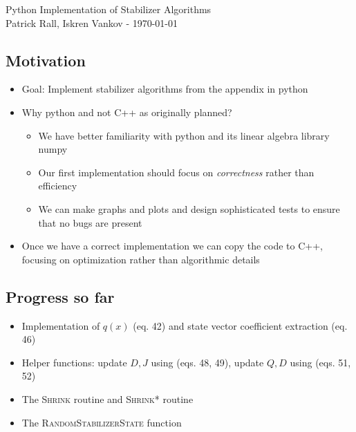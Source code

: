 \documentclass[11pt]{article}
\begin{document}
\begin{center}
    {\LARGE Python Implementation of Stabilizer Algorithms }
\vspace{2mm}
{\large \\ Patrick Rall, Iskren Vankov - \today}
\end{center}

\newenvironment{Figure}
  {\par\medskip\noindent\minipage{\linewidth}}
  {\endminipage\par\medskip}


\subsection*{Motivation}
\begin{itemize}
    \item Goal: Implement stabilizer algorithms from the appendix in python
    \item Why python and not C++ as originally planned? 
    \begin{itemize}
        \item We have better familiarity with python and its linear algebra library numpy 
        \item Our first implementation should focus on \textit{correctness} rather than efficiency
        \item We can make graphs and plots and design sophisticated tests to ensure that no bugs are present
    \end{itemize}
    \item Once we have a correct implementation we can copy the code to C++, focusing on optimization rather than algorithmic details
\end{itemize}

\subsection*{Progress so far}
\begin{itemize}
    \item Implementation of $q(x)$ (eq. 42) and state vector coefficient extraction (eq. 46) 
    \item Helper functions: update $D,J$ using (eqs. 48, 49), update $Q,D$ using (eqs. 51, 52)
    \item The \textsc{Shrink} routine and \textsc{Shrink*} routine
    \item The \textsc{RandomStabilizerState} function
\end{itemize}
\end{document}
